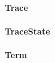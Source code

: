 \documentclass[parskip=full]{scrartcl}
\begin{document}
\paragraph{Trace}
\paragraph{TraceState}
\paragraph{Term}
\end{document}
